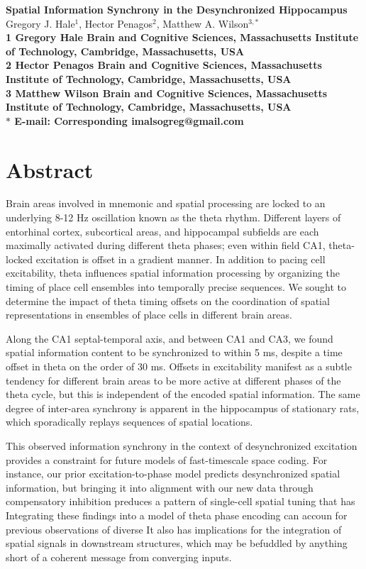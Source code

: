 \documentclass[10pt]{article}
\date{}
\begin{document}
\begin{flushleft}
{\Large
\textbf{Spatial Information Synchrony in the Desynchronized Hippocampus}
}
\\
Gregory J. Hale$^{1}$, 
Hector Penagos$^{2}$, 
Matthew A. Wilson$^{3,\ast}$
\\
\bf{1} Gregory Hale Brain and Cognitive Sciences, Massachusetts Institute of Technology, Cambridge, Massachusetts, USA
\\
\bf{2} Hector Penagos Brain and Cognitive Sciences, Massachusetts Institute of Technology, Cambridge, Massachusetts, USA
\\
\bf{3} Matthew Wilson Brain and Cognitive Sciences, Massachusetts Institute of Technology, Cambridge, Massachusetts, USA
\\
$\ast$ E-mail: Corresponding imalsogreg@gmail.com
\end{flushleft}

\section*{Abstract}
Brain areas involved in mnemonic and spatial processing are locked to an underlying 8-12 Hz oscillation known as the theta rhythm.  Different layers of entorhinal cortex, subcortical areas, and hippocampal subfields are each maximally activated during different theta phases; even within field CA1, theta-locked excitation is offset in a gradient manner.  In addition to pacing cell excitability, theta influences spatial information processing by organizing the timing of place cell ensembles into temporally precise sequences. We sought to determine the impact of theta timing offsets on the coordination of spatial representations in ensembles of place cells in different brain areas.

Along the CA1 septal-temporal axis, and between CA1 and CA3, we found spatial information content to be synchronized to within 5 ms, despite a time offset in theta on the order of 30 ms. Offsets in excitability manifest as a subtle tendency for different brain areas to be more active at different phases of the theta cycle, but this is independent of the encoded spatial information. The same degree of inter-area synchrony is apparent in the hippocampus of stationary rats, which sporadically replays sequences of spatial locations.

This observed information synchrony in the context of desynchronized excitation provides a constraint for future models of fast-timescale space coding. For instance, our prior excitation-to-phase model predicts desynchronized spatial information, but bringing it into alignment with our new data through compensatory inhibition preduces a pattern of single-cell spatial tuning that has 
Integrating these findings into a model of theta phase encoding can accoun for previous observations of diverse It also has implications for the integration of spatial signals in downstream structures, which may be befuddled by anything short of a coherent message from converging inputs.
\end{document}
